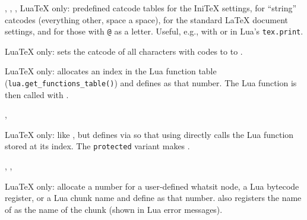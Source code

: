 \documentclass{l3in2edoc}
\begin{document}
\begin{variable}[]
  {
    \catcodetable@initex,
    \catcodetable@string,
    \catcodetable@latex,
    \catcodetable@atletter
  }
  Lua\TeX{} only: predefined catcode tables for the Ini\TeX{}
  settings, for \enquote{string} catcodes (everything other, space a
  space), for the standard \LaTeX{} document settings, and for those
  with \texttt{@} as a letter. Useful, e.g., with 
  or in Lua's \texttt{tex.print}.
\end{variable}



\begin{function}[]
  {
    \setrangecatcode
  }
  \begin{syntax}
       
  \end{syntax}
  Lua\TeX{} only: sets the catcode of all characters with codes
   to  to .
\end{function}



\begin{function}[]
  {
    \newluafunction
  }
  \begin{syntax}
     
  \end{syntax}
  Lua\TeX{} only: allocates an index in the Lua function table
  (\texttt{lua.get\_functions\_table()}) and defines  as
  that number. The Lua function is then called with
  .
\end{function}



\begin{function}[]
  {
    \newluacmd,
    \newprotectedluacmd
  }
  \begin{syntax}
     
  \end{syntax}
  Lua\TeX{} only: like , but defines 
  via  so that using  directly calls the Lua
  function stored at its index. The \texttt{protected} variant makes
   .
\end{function}



\begin{function}[]
  {
    \newwhatsit,
    \newluabytecode,
    \newluachunkname
  }
  \begin{syntax}
     
  \end{syntax}
  Lua\TeX{} only: allocate a number for a user-defined whatsit node,
  a Lua bytecode register, or a Lua chunk name and define 
  as that number.  also registers the name of
   as the name of the chunk (shown in Lua error messages).
\end{function}
\end{document}
